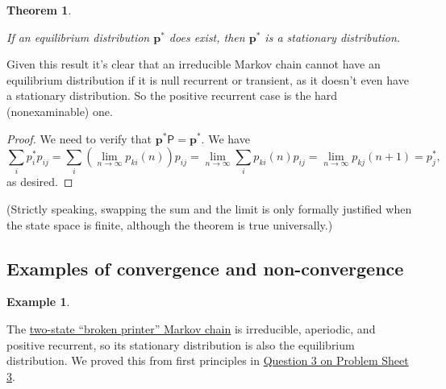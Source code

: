 \documentclass[
  a4paper,
]{article}
\newtheorem{theorem}{Theorem}[section]
\theoremstyle{definition}
\theoremstyle{definition}
\newtheorem{example}{Example}[section]
\theoremstyle{definition}
\theoremstyle{remark}
\begin{document}
\begin{theorem}
\protect\hypertarget{thm:unlabeled-div-15}{}\label{thm:unlabeled-div-15}

If an equilibrium distribution \(\mathbf p^*\) does exist, then \(\mathbf p^*\) is a stationary distribution.

\end{theorem}

Given this result it's clear that an irreducible Markov chain cannot have an equilibrium distribution if it is null recurrent or transient, as it doesn't even have a stationary distribution. So the positive recurrent case is the hard (nonexaminable) one.

\begin{proof}

We need to verify that \(\mathbf p^* \mathsf P = \mathbf p^*\). We have
\[ \sum_i p_i^* p_{ij} = \sum_i \left(\lim_{n\to\infty} p_{ki}(n) \right) p_{ij} = \lim_{n\to\infty} \sum_i p_{ki}(n) p_{ij} = \lim_{n\to\infty} p_{kj}(n+1) = p^*_j , \]
as desired.

\end{proof}

(Strictly speaking, swapping the sum and the limit is only formally justified when the state space is finite, although the theorem is true universally.)

\hypertarget{convergence-examples}{%
\subsection{Examples of convergence and non-convergence}\label{convergence-examples}}

\begin{example}
\protect\hypertarget{exm:conv1}{}\label{exm:conv1}

The \protect\hyperlink{S05-example}{two-state ``broken printer'' Markov chain} is irreducible, aperiodic, and positive recurrent, so its stationary distribution is also the equilibrium distribution. We proved this from first principles in \protect\hyperlink{P03}{Question 3 on Problem Sheet 3}.

\end{example}
\end{document}
